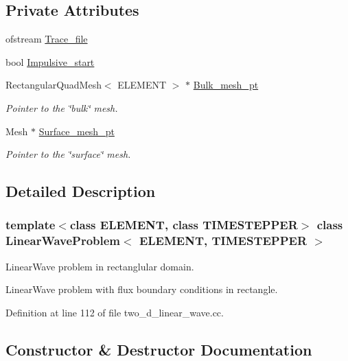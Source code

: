 \subsection*{Private Attributes}
\begin{DoxyCompactItemize}
\item 
ofstream \hyperlink{classLinearWaveProblem_ac75d13211cfb08c7cfba0ea129711a09}{Trace\+\_\+file}
\item 
bool \hyperlink{classLinearWaveProblem_a296c67402f065a1a3776064492003670}{Impulsive\+\_\+start}
\item 
Rectangular\+Quad\+Mesh$<$ E\+L\+E\+M\+E\+NT $>$ $\ast$ \hyperlink{classLinearWaveProblem_aace6aa3bcf449d57976786ef776c0f5a}{Bulk\+\_\+mesh\+\_\+pt}
\begin{DoxyCompactList}\small\item\em Pointer to the \char`\"{}bulk\char`\"{} mesh. \end{DoxyCompactList}\item 
Mesh $\ast$ \hyperlink{classLinearWaveProblem_a286d4ca798729d03303b072bb704593f}{Surface\+\_\+mesh\+\_\+pt}
\begin{DoxyCompactList}\small\item\em Pointer to the \char`\"{}surface\char`\"{} mesh. \end{DoxyCompactList}\end{DoxyCompactItemize}


\subsection{Detailed Description}
\subsubsection*{template$<$class E\+L\+E\+M\+E\+NT, class T\+I\+M\+E\+S\+T\+E\+P\+P\+ER$>$\newline
class Linear\+Wave\+Problem$<$ E\+L\+E\+M\+E\+N\+T, T\+I\+M\+E\+S\+T\+E\+P\+P\+E\+R $>$}

Linear\+Wave problem in rectanglular domain. 

Linear\+Wave problem with flux boundary conditions in rectangle. 

Definition at line 112 of file two\+\_\+d\+\_\+linear\+\_\+wave.\+cc.



\subsection{Constructor \& Destructor Documentation}
\mbox{\label{classLinearWaveProblem_a459a58b7afd588cfa78a5e1e98c3c41e}} 
